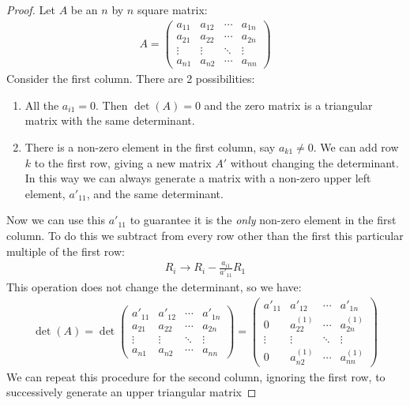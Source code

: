 \begin{proof}
Let $A$ be an $n$ by $n$ square matrix:
\begin{align*}
A =
\begin{pmatrix}
a_{11} & a_{12} & \cdots & a_{1n} \\
a_{21} & a_{22} & \cdots & a_{2n} \\
\vdots & \vdots & \ddots & \vdots \\
a_{n1} & a_{n2} & \cdots & a_{nn}
\end{pmatrix}
\end{align*}
Consider the first column. There are 2 possibilities:
\begin{enumerate}
\item All the $a_{i1}=0$. Then $\det(A)=0$ and the zero matrix is a triangular matrix with the same determinant.
\item There is a non-zero element in the first column, say $a_{k1}\neq 0$. We can add row $k$ to the first row, giving a new matrix $A'$ without changing the determinant. In this way we can always generate a matrix with a non-zero upper left element, $a'_{11}$, and the same determinant.
\end{enumerate}
Now we can use this $a'_{11}$ to guarantee it is the \textit{only} non-zero element in the first column. To do this we subtract from every row other than the first this particular multiple of the first row:
\begin{align*}
R_i \to R_i - \frac{a_{i1}}{a'_{11}}R_1
\end{align*}
This operation does not change the determinant, so we have:
\begin{align*}
\det(A)=\det\begin{pmatrix}
a'_{11} & a'_{12} & \cdots & a'_{1n} \\
a_{21} & a_{22} & \cdots & a_{2n} \\
\vdots & \vdots & \ddots & \vdots \\
a_{n1} & a_{n2} & \cdots & a_{nn}
\end{pmatrix}
=
\begin{pmatrix}
a'_{11} & a'_{12} & \cdots & a'_{1n} \\
0 & a^{(1)}_{22} & \cdots & a^{(1)}_{2n} \\
\vdots & \vdots & \ddots & \vdots \\
0 & a^{(1)}_{n2} & \cdots & a^{(1)}_{nn}
\end{pmatrix}
\end{align*}
We can repeat this procedure for the second column, ignoring the first row, to successively generate an upper triangular matrix

\end{proof}
